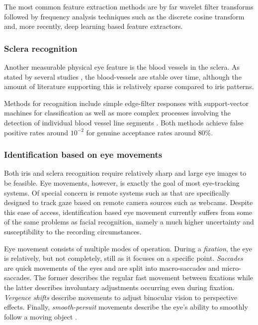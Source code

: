 The most common feature extraction methods are by far wavelet filter transforms \parencite{daugman2007new, ma2002iris, ma2004efficient, poursaberi2006iris, rydgren2004iris, zhu2000biometric} followed by frequency analysis techniques such as the discrete cosine transform\cite{iris-dct, monroDCTBasedIrisRecognition2007} and, more recently, deep learning based feature extractors\cite{gangwarDeepIrisNetDeepIris2016, nguyenIrisRecognitionOfftheShelf2018}.

\subsubsection{Sclera recognition}
Another measurable physical eye feature is the blood vessels in the sclera. As stated by several studies \cite{dasScleraRecognitionSurvey2013, zhouNewHumanIdentification2012}, the blood-vessels are stable over time, although the amount of literature supporting this is relatively sparse compared to iris patterns.

Methods for recognition include simple edge-filter responses with support-vector machines for classification \cite{dasNewEfficientAdaptive2014} as well as more complex processes involving the detection of individual blood vessel line segments \cite{zhouNewHumanIdentification2012}. Both methods achieve false positive rates around $10^{-2}$ for genuine acceptance rates around $80\%$.

\subsubsection{Identification based on eye movements}
Both iris and sclera recognition require relatively sharp and large eye images to be feasible. Eye movements, however, is exactly the goal of most eye-tracking systems. Of special concern is remote systems such as \cite{zhangMPIIGazeRealWorldDataset2017} that are specifically designed to track gaze based on remote camera sources such as webcams. Despite this ease of access, identification based eye movement currently suffers from some of the same problems as facial recognition, namely a much higher uncertainty and susceptibility to the recording circumstances.

Eye movement consists of multiple modes of operation. During a \emph{fixation}, the eye is relatively, but not completely, still as it focuses on a specific point. \emph{Saccades} are quick movements of the eyes and are split into macro-saccades and micro-saccades. The former describes the regular fast movement between fixations while the latter describes involuntary adjustments occurring even during fixation. \emph{Vergence shifts} describe movements to adjust binocular vision to perspective effects. Finally, \emph{smooth-persuit} movements describe the eye's ability to smoothly follow a moving object \cite{duchowskiBreadthfirstSurveyEyetracking2002}.

